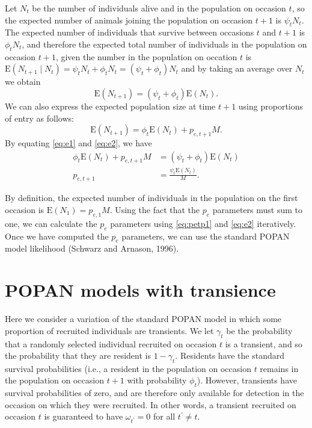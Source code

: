 \documentclass{article}
\newcommand{\E}[1]{\mathrm{E}(#1)}
\begin{document}
Let $N_t$ be the number of individuals alive and in the population on
occasion $t$, so the expected number of animals joining the population
on occasion $t + 1$ is $\psi_t N_t$. The expected number of
individuals that survive between occasions $t$ and $t + 1$ is $\phi_t
N_t$, and therefore the expected total number of individuals in the
population on occasion $t + 1$, given the number in the population on
occation $t$ is $\E{N_{t + 1} \mid N_t} = \psi_t N_t + \phi_t N_t =
(\psi_t + \phi_t)N_t$ and by taking an average over $N_t$ we obtain
\begin{equation}
  \E{N_{t + 1}} = (\psi_t + \phi_t) \E{N_t}. \label{eq:e1}
\end{equation}
We can also express the expected population size at time $t + 1$ using
proportions of entry as follows:
\begin{equation}
  \E{N_{t + 1}} = \phi_t \E{N_t} + p_{e, t + 1} M. \label{eq:e2}
\end{equation}
By equating \eqref{eq:e1} and \eqref{eq:e2}, we have
\begin{align}
  \phi_t \E{N_t} + p_{e, t + 1} M &= (\psi_t + \phi_t) \E{N_t} \nonumber \\
  p_{e, t + 1} &= \frac{\psi_t \E{N_t}}{M}. \label{eq:petp1}
\end{align}

By definition, the expected number of individuals in the population on
the first occasion is $\E{N_1} = p_{e, 1} M$. Using the fact that the
$p_e$ parameters must sum to one, we can calculate the $p_e$
parameters using \eqref{eq:petp1} and \eqref{eq:e2} iteratively. Once
we have computed the $p_e$ parameters, we can use the standard POPAN
model likelihood (Schwarz and Arnason, 1996).

\section{POPAN models with transience}

Here we consider a variation of the standard POPAN model in which some
proportion of recruited individuals are transients. We let $\gamma_t$
be the probability that a randomly selected individual recruited on
occasion $t$ is a transient, and so the probability that they are
resident is $1 - \gamma_t$. Residents have the standard survival
probabilities (i.e., a resident in the population on occasion $t$
remains in the population on occasion $t + 1$ with probability
$\phi_t$). However, transients have survival probabilities of zero,
and are therefore only available for detection in the occasion on
which they were recruited. In other words, a transient recruited on
occasion $t$ is guaranteed to have $\omega_{t^{\prime}} = 0$ for all
$t^\prime \ne t$.
\end{document}

